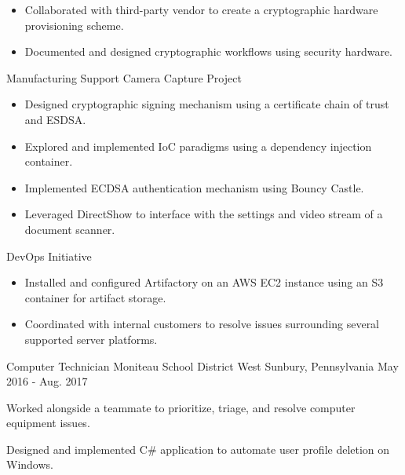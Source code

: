 \begin{cventries}
{\begin{cvitems}
{      \begin{itemize}
        \item Collaborated with third-party vendor to create a cryptographic hardware provisioning scheme.
        \item Documented and designed cryptographic workflows using security hardware.
      \end{itemize} 
    }
    \item
    {
      {Manufacturing Support Camera Capture Project}
      \begin{itemize}
        \item Designed cryptographic signing mechanism using a certificate chain of trust and ESDSA.
        \item Explored and implemented IoC paradigms using a dependency injection container.
        \item Implemented ECDSA authentication mechanism using Bouncy Castle.
        \item Leveraged DirectShow to interface with the settings and video stream of a document scanner.
      \end{itemize}
    }
    \item
    {
      {DevOps Initiative}
      \begin{itemize}
        \item Installed and configured Artifactory on an AWS EC2 instance using an S3 container for artifact storage.
        \item Coordinated with internal customers to resolve issues surrounding several supported server platforms.
      \end{itemize}
    }
    \end{cvitems}
  }

\cventry
  {Computer Technician} %
  {Moniteau School District} %
  {West Sunbury, Pennsylvania} %
  {May 2016 - Aug. 2017} %
  {
    \begin{cvitems}
      \item Worked alongside a teammate to prioritize, triage, and resolve computer equipment issues.
      \item Designed and implemented C\# application to automate user profile deletion on Windows.
    \end{cvitems}
  }

\end{cventries}
